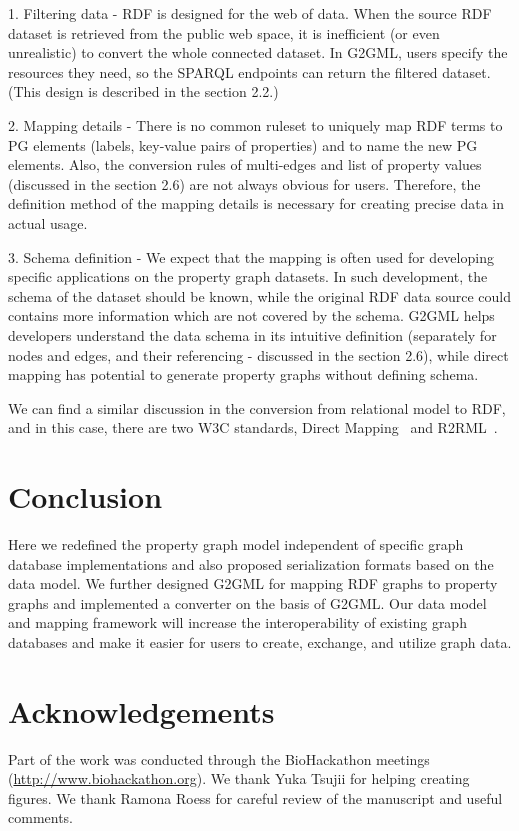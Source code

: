 \documentclass[runningheads]{llncs}
\begin{document}
1. Filtering data - RDF is designed for the web of data. When the source RDF dataset is retrieved from the public web space, it is inefficient (or even unrealistic) to convert the whole connected dataset. In G2GML, users specify the resources they need, so the SPARQL endpoints can return the filtered dataset. (This design is described in the section 2.2.)

2. Mapping details - There is no common ruleset to uniquely map RDF terms to PG elements (labels, key-value pairs of properties) and to name the new PG elements. Also, the conversion rules of multi-edges and list of property values (discussed in the section 2.6) are not always obvious for users. Therefore, the definition method of the mapping details is necessary for creating precise data in actual usage.

3. Schema definition - We expect that the mapping is often used for developing specific applications on the property graph datasets. In such development, the schema of the dataset should be known, while the original RDF data source could contains more information which are not covered by the schema. G2GML helps developers understand the data schema in its intuitive definition (separately for nodes and edges, and their referencing - discussed in the section 2.6), while direct mapping has potential to generate property graphs without defining schema.

We can find a similar discussion in the conversion from relational model to RDF, and in this case, there are two W3C standards, Direct Mapping~\cite{dm} and R2RML~\cite{r2rml}.

\section{Conclusion}
Here we redefined the property graph model independent of specific graph database implementations and also proposed serialization formats based on the data model.
We further designed G2GML for mapping RDF graphs to property graphs and implemented a converter on the basis of G2GML.
Our data model and mapping framework will increase the interoperability of existing graph databases and make it easier for users to create, exchange, and utilize graph data.

\section*{Acknowledgements}
Part of the work was conducted through the BioHackathon meetings (\url{http://www.biohackathon.org}). We thank Yuka Tsujii for helping creating figures. We thank Ramona Roess for careful review of the manuscript and useful comments.
\end{document}
